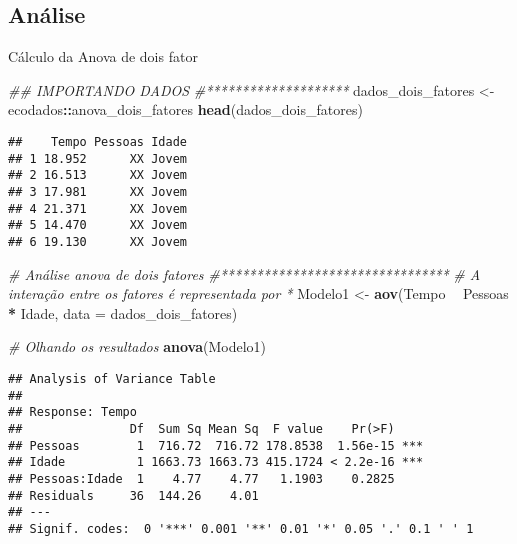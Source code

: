 \documentclass[
]{book}
\newenvironment{Shaded}{\begin{snugshade}}{\end{snugshade}}
\newcommand{\CommentTok}[1]{\textcolor[rgb]{0.56,0.35,0.01}{\textit{#1}}}
\newcommand{\DataTypeTok}[1]{\textcolor[rgb]{0.13,0.29,0.53}{#1}}
\newcommand{\KeywordTok}[1]{\textcolor[rgb]{0.13,0.29,0.53}{\textbf{#1}}}
\newcommand{\NormalTok}[1]{#1}
\newcommand{\OperatorTok}[1]{\textcolor[rgb]{0.81,0.36,0.00}{\textbf{#1}}}
\newcommand{\StringTok}[1]{\textcolor[rgb]{0.31,0.60,0.02}{#1}}
\begin{document}
\hypertarget{anuxe1lise-7}{%
\subsection{Análise}\label{anuxe1lise-7}}

Cálculo da Anova de dois fator

\begin{Shaded}
\begin{Highlighting}[]
\CommentTok{## IMPORTANDO DADOS}
\CommentTok{#********************}
\NormalTok{dados_dois_fatores <-}\StringTok{ }\NormalTok{ecodados}\OperatorTok{::}\NormalTok{anova_dois_fatores}
\KeywordTok{head}\NormalTok{(dados_dois_fatores) }
\end{Highlighting}
\end{Shaded}

\begin{verbatim}
##    Tempo Pessoas Idade
## 1 18.952      XX Jovem
## 2 16.513      XX Jovem
## 3 17.981      XX Jovem
## 4 21.371      XX Jovem
## 5 14.470      XX Jovem
## 6 19.130      XX Jovem
\end{verbatim}

\begin{Shaded}
\begin{Highlighting}[]
\CommentTok{# Análise anova de dois fatores }
\CommentTok{#********************************}
\CommentTok{# A interação entre os fatores é representada por *}
\NormalTok{Modelo1 <-}\StringTok{ }\KeywordTok{aov}\NormalTok{(Tempo }\OperatorTok{~}\StringTok{ }\NormalTok{Pessoas }\OperatorTok{*}\StringTok{ }\NormalTok{Idade, }\DataTypeTok{data =}\NormalTok{ dados_dois_fatores) }

\CommentTok{# Olhando os resultados}
\KeywordTok{anova}\NormalTok{(Modelo1)}
\end{Highlighting}
\end{Shaded}

\begin{verbatim}
## Analysis of Variance Table
## 
## Response: Tempo
##               Df  Sum Sq Mean Sq  F value    Pr(>F)    
## Pessoas        1  716.72  716.72 178.8538  1.56e-15 ***
## Idade          1 1663.73 1663.73 415.1724 < 2.2e-16 ***
## Pessoas:Idade  1    4.77    4.77   1.1903    0.2825    
## Residuals     36  144.26    4.01                       
## ---
## Signif. codes:  0 '***' 0.001 '**' 0.01 '*' 0.05 '.' 0.1 ' ' 1
\end{verbatim}
\end{document}
